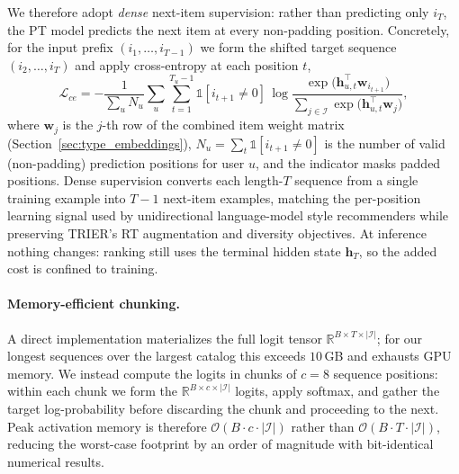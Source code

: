 We therefore adopt \emph{dense} next-item supervision: rather than predicting only $i_T$, the PT model predicts the next item at every non-padding position. Concretely, for the input prefix $(i_1, \dots, i_{T-1})$ we form the shifted target sequence $(i_2, \dots, i_T)$ and apply cross-entropy at each position $t$,
\begin{equation}
\label{eq:dense_ce}
\mathcal{L}_{ce} = -\frac{1}{\sum_{u} N_u} \sum_{u} \sum_{t=1}^{T_u-1} \mathbb{1}[i_{t+1} \neq 0]\,
\log \frac{\exp\!\bigl(\mathbf{h}_{u,t}^{\top} \mathbf{w}_{i_{t+1}}\bigr)}
       {\sum_{j \in \mathcal{I}} \exp\!\bigl(\mathbf{h}_{u,t}^{\top} \mathbf{w}_j\bigr)},
\end{equation}
where $\mathbf{w}_j$ is the $j$-th row of the combined item weight matrix (Section~\ref{sec:type_embeddings}), $N_u = \sum_t \mathbb{1}[i_{t+1}\neq 0]$ is the number of valid (non-padding) prediction positions for user $u$, and the indicator masks padded positions. Dense supervision converts each length-$T$ sequence from a single training example into $T-1$ next-item examples, matching the per-position learning signal used by unidirectional language-model style recommenders while preserving TRIER's RT augmentation and diversity objectives. At inference nothing changes: ranking still uses the terminal hidden state $\mathbf{h}_T$, so the added cost is confined to training.

\paragraph{Memory-efficient chunking.} A direct implementation materializes the full logit tensor $\mathbb{R}^{B \times T \times |\mathcal{I}|}$; for our longest sequences over the largest catalog this exceeds $10$\,GB and exhausts GPU memory. We instead compute the logits in chunks of $c{=}8$ sequence positions: within each chunk we form the $\mathbb{R}^{B \times c \times |\mathcal{I}|}$ logits, apply softmax, and gather the target log-probability before discarding the chunk and proceeding to the next. Peak activation memory is therefore $\mathcal{O}(B \cdot c \cdot |\mathcal{I}|)$ rather than $\mathcal{O}(B \cdot T \cdot |\mathcal{I}|)$, reducing the worst-case footprint by an order of magnitude with bit-identical numerical results.

